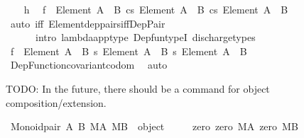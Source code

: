 \begin{isabellebody}
\ \ \isamarkupfalse%
\ h\ \isamarkupfalse%
\ {\isachardoublequoteopen}{\isacharquery}{\kern0pt}f\ {\isacharcolon}{\kern0pt}\ Element\ {\isacharparenleft}{\kern0pt}A\ {\isasymtimes}\ B{\isacharparenright}{\kern0pt}\ {\isasymrightarrow}cs\ Element\ {\isacharparenleft}{\kern0pt}A\ {\isasymtimes}\ B{\isacharparenright}{\kern0pt}\ {\isasymrightarrow}cs\ Element\ {\isacharparenleft}{\kern0pt}A\ {\isasymtimes}\ B{\isacharparenright}{\kern0pt}{\isachardoublequoteclose}\isanewline
\ \ \ \ \isamarkupfalse%
\ {\isacharparenleft}{\kern0pt}auto\ iff{\isacharcolon}{\kern0pt}\ Element{\isacharunderscore}{\kern0pt}dep{\isacharunderscore}{\kern0pt}pairs{\isacharunderscore}{\kern0pt}iff{\isacharunderscore}{\kern0pt}Dep{\isacharunderscore}{\kern0pt}Pair\isanewline
\ \ \ \ \ \ intro{\isacharbang}{\kern0pt}{\isacharcolon}{\kern0pt}\ lambda{\isacharunderscore}{\kern0pt}app{\isacharunderscore}{\kern0pt}type\ Dep{\isacharunderscore}{\kern0pt}fun{\isacharunderscore}{\kern0pt}typeI{\isacharcomma}{\kern0pt}\ discharge{\isacharunderscore}{\kern0pt}types{\isacharparenright}{\kern0pt}\isanewline
\ \ \isamarkupfalse%
\ \isamarkupfalse%
\ {\isachardoublequoteopen}{\isacharquery}{\kern0pt}f\ {\isacharcolon}{\kern0pt}\ Element\ {\isacharparenleft}{\kern0pt}A\ {\isasymtimes}\ B{\isacharparenright}{\kern0pt}\ {\isasymrightarrow}s\ {\isacharparenleft}{\kern0pt}Element\ {\isacharparenleft}{\kern0pt}A\ {\isasymtimes}\ B{\isacharparenright}{\kern0pt}\ {\isasymrightarrow}s\ Element\ {\isacharparenleft}{\kern0pt}A\ {\isasymtimes}\ B{\isacharparenright}{\kern0pt}{\isacharparenright}{\kern0pt}{\isachardoublequoteclose}\isanewline
\ \ \ \ \isamarkupfalse%
\ Dep{\isacharunderscore}{\kern0pt}Function{\isacharunderscore}{\kern0pt}covariant{\isacharunderscore}{\kern0pt}codom\ \isamarkupfalse%
\ auto\isanewline
{}\isamarkupfalse%
%
\endisatagproof
{\isafoldproof}%
%
\isadelimproof
%
\endisadelimproof
%
\begin{isamarkuptext}%
TODO: In the future, there should be a command for object
composition/extension.%
\end{isamarkuptext}\isamarkuptrue%
\isamarkupfalse%
\ {\isachardoublequoteopen}Monoid{\isacharunderscore}{\kern0pt}pair\ A\ B\ MA\ MB\ {\isasymequiv}\ object\ {\isacharbraceleft}{\kern0pt}\isanewline
\ \ \ \ {\isasymlangle}{\isacharat}{\kern0pt}zero{\isacharcomma}{\kern0pt}\ {\isasymlangle}zero\ MA{\isacharcomma}{\kern0pt}\ zero\ MB{\isasymrangle}{\isasymrangle}{\isacharcomma}{\kern0pt}\isanewline

\end{isabellebody}

